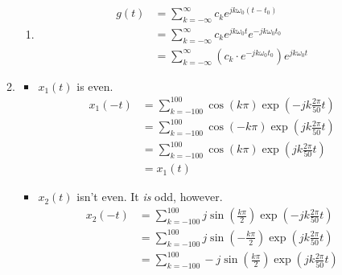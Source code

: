 \documentclass[12pt]{article}
\begin{document}
\begin{enumerate}
\begin{enumerate}
\begin{enumerate}
                              \item \[\begin{aligned}
                                                g(t)
                                                 & = \sum_{k=-\infty}^{\infty} c_k e^{jk\omega_0(t-t_0)}                                         \\
                                                 & = \sum_{k=-\infty}^{\infty} c_k e^{jk\omega_0t}e^{-jk\omega_0t_0}                             \\
                                                 & = \boxed{\sum_{k=-\infty}^{\infty} \left(c_k \cdot e^{-jk\omega_0t_0}\right) e^{jk\omega_0t}}
                                          \end{aligned}\]
                        \end{enumerate}
                  \item \begin{itemize}
                              \item $x_1(t)$ is even.
                                    \begin{align*}
                                          x_1(-t)
                                           & = \sum_{k=-100}^{100} \cos(k\pi)\exp\left(-jk\frac{2\pi}{50}t\right) \\
                                           & = \sum_{k=-100}^{100} \cos(-k\pi)\exp\left(jk\frac{2\pi}{50}t\right) \\
                                           & = \sum_{k=-100}^{100} \cos(k\pi)\exp\left(jk\frac{2\pi}{50}t\right)  \\
                                           & = x_1(t)
                                    \end{align*}
                              \item $x_2(t)$ isn't even. It \textit{is} odd, however.
                                    \begin{align*}
                                          x_2(-t)
                                           & = \sum_{k=-100}^{100} j\sin\left(\frac{k\pi}{2}\right)\exp\left(-jk\frac{2\pi}{50}t\right) \\
                                           & = \sum_{k=-100}^{100} j\sin\left(-\frac{k\pi}{2}\right)\exp\left(jk\frac{2\pi}{50}t\right) \\
                                           & = \sum_{k=-100}^{100} -j\sin\left(\frac{k\pi}{2}\right)\exp\left(jk\frac{2\pi}{50}t\right) \\

\end{align*}
\end{itemize}
\end{enumerate}
\end{enumerate}
\end{document}
